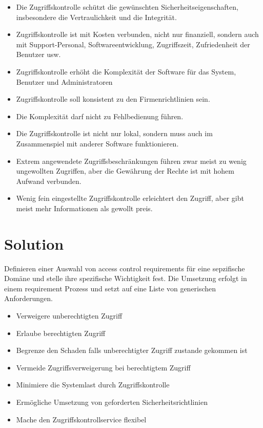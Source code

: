 \begin{itemize}
  \item Die Zugriffskontrolle schützt die gewünschten Sicherheitseigenschaften, insbesondere die Vertraulichkeit und die Integrität.
  \item Zugriffskontrolle ist mit Kosten verbunden, nicht nur finanziell, sondern auch mit Support-Personal, Softwareentwicklung, Zugriffszeit, Zufriedenheit der Benutzer usw.
  \item Zugriffskontrolle erhöht die Komplexität der Software für das System, Benutzer und Administratoren
  \item Zugriffskontrolle soll konsistent zu den Firmenrichtlinien sein.
  \item Die Komplexität darf nicht zu Fehlbedienung führen.
  \item Die Zugriffskontrolle ist nicht nur lokal, sondern muss auch im Zusammenspiel mit anderer Software funktionieren.
  \item Extrem angewendete Zugriffsbeschränkungen führen zwar meist zu wenig ungewollten Zugriffen, aber die Gewährung der Rechte ist mit hohem Aufwand verbunden.
  \item Wenig fein eingestellte Zugriffskontrolle erleichtert den Zugriff, aber gibt meist mehr Informationen als gewollt preis.
\end{itemize}

\section{Solution}
Definieren einer Auswahl von access control requirements für eine sepzifische Domäne und stelle ihre spezifische Wichtigkeit fest. Die Umsetzung erfolgt in einem requirement Prozess und setzt auf eine Liste von generischen Anforderungen.
\begin{itemize}
  \item Verweigere unberechtigten Zugriff
  \item Erlaube berechtigten Zugriff
  \item Begrenze den Schaden falls unberechtigter Zugriff zustande gekommen ist
  \item Vermeide Zugriffsverweigerung bei berechtigtem Zugriff
  \item Minimiere die Systemlast durch Zugriffskontrolle
  \item Ermögliche Umsetzung von geforderten Sicherheitsrichtlinien
  \item Mache den Zugriffskontrollservice flexibel
\end{itemize}

